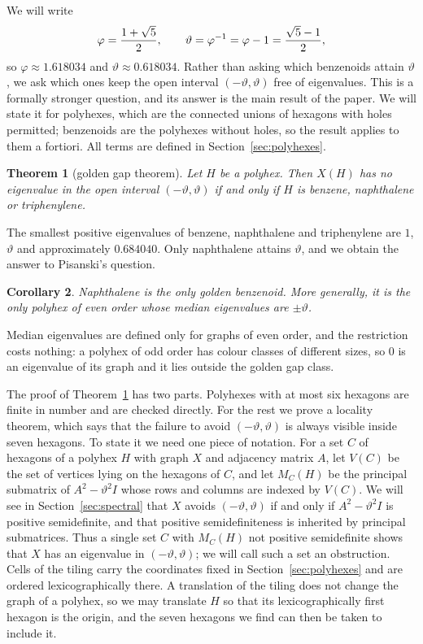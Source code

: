 \documentclass[11pt]{article}
\newcommand\vphi{\varphi}
\newcommand\thetaG{\vartheta}
\newtheorem{theorem}{Theorem}[section]
\newtheorem{corollary}[theorem]{Corollary}
\theoremstyle{definition}
\begin{document}
We will write
\[
 \vphi=\frac{1+\sqrt5}{2},\qquad
 \thetaG=\vphi\inv=\vphi-1=\frac{\sqrt5-1}{2},
\]
so $\vphi\approx1.618034$ and $\thetaG\approx0.618034$.  Rather than asking
which benzenoids attain $\thetaG$, we ask which ones keep the open interval
$(-\thetaG,\thetaG)$ free of eigenvalues.  This is a formally stronger
question, and its answer is the main result of the paper.  We will state it
for polyhexes, which are the connected unions of hexagons with holes
permitted; benzenoids are the polyhexes without holes, so the result applies
to them a fortiori.  All terms are defined in Section~\ref{sec:polyhexes}.

\begin{theorem}[golden gap theorem]\label{thm:gap}
Let $H$ be a polyhex.  Then $X(H)$ has no eigenvalue in the open interval
$(-\thetaG,\thetaG)$ if and only if $H$ is benzene, naphthalene or
triphenylene.
\end{theorem}

The smallest positive eigenvalues of benzene, naphthalene and triphenylene
are $1$, $\thetaG$ and approximately $0.684040$.  Only naphthalene attains
$\thetaG$, and we obtain the answer to Pisanski's question.

\begin{corollary}\label{cor:pisanski}
Naphthalene is the only golden benzenoid.  More generally, it is the only
polyhex of even order whose median eigenvalues are $\pm\thetaG$.
\end{corollary}

Median eigenvalues are defined only for graphs of even order, and the
restriction costs nothing: a polyhex of odd order has colour classes of
different sizes, so $0$ is an eigenvalue of its graph and it lies outside the
golden gap class.

The proof of Theorem~\ref{thm:gap} has two parts.  Polyhexes with at most
six hexagons are finite in number and are checked directly.  For the rest we
prove a locality theorem, which says that the failure to avoid
$(-\thetaG,\thetaG)$ is always visible inside seven hexagons.  To state it we
need one piece of notation.  For a set $C$ of hexagons of a polyhex $H$ with
graph $X$ and adjacency matrix $A$, let $V(C)$ be the set of vertices lying
on the hexagons of $C$, and let $M_C(H)$ be the principal submatrix of
$A^2-\thetaG^2I$ whose rows and columns are indexed by $V(C)$.  We will see
in Section~\ref{sec:spectral} that $X$ avoids $(-\thetaG,\thetaG)$ if and
only if $A^2-\thetaG^2I$ is positive semidefinite, and that positive
semidefiniteness is inherited by principal submatrices.  Thus a single set
$C$ with $M_C(H)$ not positive semidefinite shows that $X$ has an eigenvalue
in $(-\thetaG,\thetaG)$; we will call such a set an obstruction.  Cells of the
tiling carry the coordinates fixed in Section~\ref{sec:polyhexes} and are
ordered lexicographically there.  A translation of the tiling does not change
the graph of a polyhex, so we may translate $H$ so that its lexicographically
first hexagon is the origin, and the seven hexagons we find can then be taken
to include it.
\end{document}
